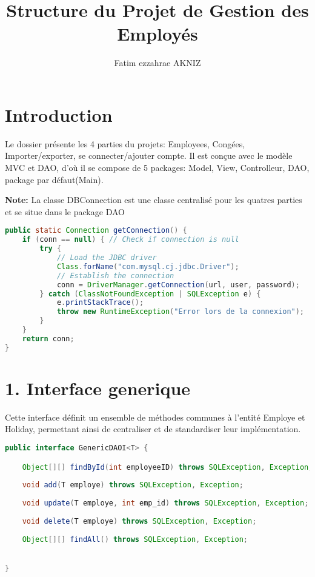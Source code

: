 \documentclass[a4paper,12pt]{report}
\title{\textbf{Structure du Projet de Gestion des Employés}}
\author{Fatim ezzahrae AKNIZ}
\begin{document}
\maketitle

\section*{\textcolor{myblue}{Introduction}}

Le dossier présente les 4 parties du projets: Employees, Congées, Importer/exporter, se connecter/ajouter compte. Il est conçue avec le modèle 
MVC et DAO, d'où il se compose de 5 packages: Model, View, Controlleur, DAO, package par défaut(Main).
\vspace{0.3cm}

\textbf{Note:} La classe DBConnection est une classe centralisé pour les quatres parties et se situe dans le package DAO

\vspace{0.3cm}
\begin{lstlisting}[language=Java, caption=DAO implementation]
public static Connection getConnection() {
    if (conn == null) { // Check if connection is null
        try {
            // Load the JDBC driver
            Class.forName("com.mysql.cj.jdbc.Driver");
            // Establish the connection
            conn = DriverManager.getConnection(url, user, password);
        } catch (ClassNotFoundException | SQLException e) {
            e.printStackTrace();
            throw new RuntimeException("Error lors de la connexion");
        }
    }
    return conn;
}
\end{lstlisting}

\newpage

\section*{\textcolor{myblue}{1. Interface generique}}
Cette interface définit un ensemble de méthodes communes à l'entité Employe et Holiday, permettant ainsi de centraliser et de standardiser leur implémentation.
\begin{lstlisting}[language=Java, caption=le corps de l'interface]
public interface GenericDAOI<T> {

    Object[][] findById(int employeeID) throws SQLException, Exception;
    
    void add(T employe) throws SQLException, Exception;
    
    void update(T employe, int emp_id) throws SQLException, Exception;
    
    void delete(T employe) throws SQLException, Exception;
    
    Object[][] findAll() throws SQLException, Exception;


}
\end{lstlisting}
\end{document}
